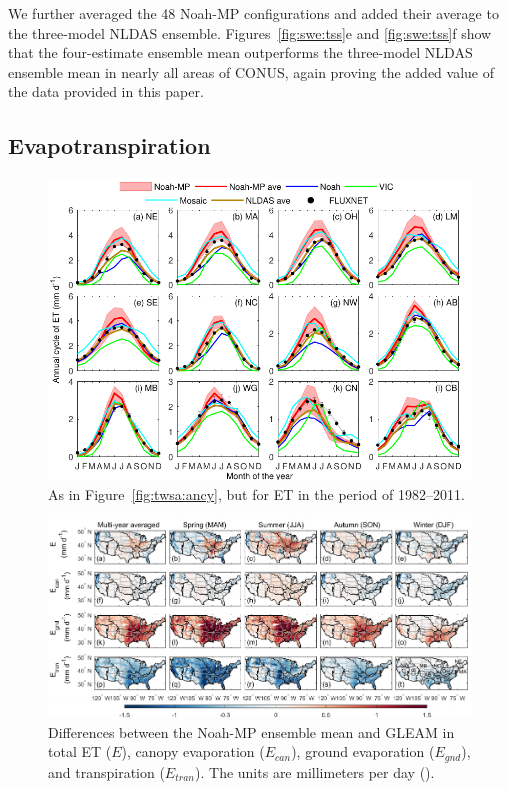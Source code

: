\documentclass[essd, manuscript]{copernicus}
\let\unit\undefined
\begin{document}
We further averaged the 48 Noah-MP configurations and added their average to the three-model NLDAS ensemble. Figures~\ref{fig:swe:tss}e and \ref{fig:swe:tss}f show that the four-estimate ensemble mean outperforms the three-model NLDAS ensemble mean in nearly all areas of CONUS, again proving the added value of the data provided in this paper.

\subsection{Evapotranspiration}\label{sec:results:et}

\begin{figure}[t]
  \includegraphics[width=14cm]{fig/fig10.pdf}
  \caption{As in Figure~\ref{fig:twsa:ancy}, but for ET in the period of 1982--2011.}
  \label{fig:et:ancy}
\end{figure}

\begin{figure}[t]
  \includegraphics[width=17cm]{fig/fig11.pdf}
  \caption{Differences between the Noah-MP ensemble mean and GLEAM in total ET (\(E\)), canopy evaporation (\(E_{can}\)), ground evaporation (\(E_{gnd}\)), and transpiration (\(E_{tran}\)). The units are millimeters per day (\unit{mm.day^{-1}}).}
  \label{fig:et:decomp}
\end{figure}
\end{document}

